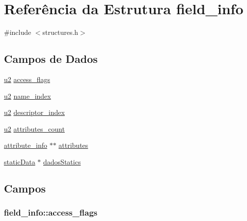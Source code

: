 \hypertarget{structfield__info}{}\section{Referência da Estrutura field\+\_\+info}
\label{structfield__info}


{\ttfamily \#include $<$structures.\+h$>$}

\subsection*{Campos de Dados}
\begin{DoxyCompactItemize}
\item 
\hyperlink{lista__operandos_8h_a732cde1300aafb73b0ea6c2558a7a54f}{u2} \hyperlink{structfield__info_aa622dc9a5b5353d2f3eb2f416dacab4b}{access\+\_\+flags}
\item 
\hyperlink{lista__operandos_8h_a732cde1300aafb73b0ea6c2558a7a54f}{u2} \hyperlink{structfield__info_a425e3ae85badd81c67ef00acca85ad9e}{name\+\_\+index}
\item 
\hyperlink{lista__operandos_8h_a732cde1300aafb73b0ea6c2558a7a54f}{u2} \hyperlink{structfield__info_a12dd492b7fb1d61da1ac14938d97b07f}{descriptor\+\_\+index}
\item 
\hyperlink{lista__operandos_8h_a732cde1300aafb73b0ea6c2558a7a54f}{u2} \hyperlink{structfield__info_a83bfa4ff84a608e3dbd1c3968ebe1b80}{attributes\+\_\+count}
\item 
\hyperlink{structattribute__info}{attribute\+\_\+info} $\ast$$\ast$ \hyperlink{structfield__info_a754de0f0fd6e62c413cca2979ca5debd}{attributes}
\item 
\hyperlink{structstaticData}{static\+Data} $\ast$ \hyperlink{structfield__info_aef0cb22b05664f3e93c74afa289fe865}{dados\+Statics}
\end{DoxyCompactItemize}


\subsection{Campos}
\subsubsection[{\texorpdfstring{access\+\_\+flags}{access_flags}}]{ field\+\_\+info\+::access\+\_\+flags}\hypertarget{structfield__info_aa622dc9a5b5353d2f3eb2f416dacab4b}{}\label{structfield__info_aa622dc9a5b5353d2f3eb2f416dacab4b}
